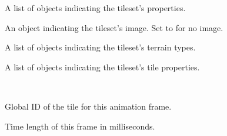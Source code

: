 \documentclass[letterpaper,10pt,english]{sphinxmanual}
\begin{document}
\begin{fulllineitems}

\begin{fulllineitems}
\label{index:tmx.Tileset.properties}
A list of {\hyperref[index:tmx.Property]{\emph{}}} objects indicating the tileset's
properties.

\end{fulllineitems}


\begin{fulllineitems}
\label{index:tmx.Tileset.image}
An {\hyperref[index:tmx.Image]{\emph{}}} object indicating the tileset's image.  Set to
 for no image.

\end{fulllineitems}


\begin{fulllineitems}
\label{index:tmx.Tileset.terraintypes}
A list of {\hyperref[index:tmx.TerrainType]{\emph{}}} objects indicating the tileset's
terrain types.

\end{fulllineitems}


\begin{fulllineitems}
\label{index:tmx.Tileset.tiles}
A list of {\hyperref[index:tmx.Tile]{\emph{}}} objects indicating the tileset's tile
properties.

\end{fulllineitems}


\end{fulllineitems}


\begin{fulllineitems}
\label{index:tmx.Frame}~

\begin{fulllineitems}
\label{index:tmx.Frame.tileid}
Global ID of the tile for this animation frame.

\end{fulllineitems}


\begin{fulllineitems}
\label{index:tmx.Frame.duration}
Time length of this frame in milliseconds.

\end{fulllineitems}


\end{fulllineitems}
\end{document}
